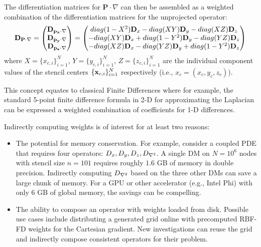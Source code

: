 The differentiation matrices for $\mathbf{P} \cdot \nabla$ can then be assembled as a weighted combination of the differentiation matrices for the unprojected operator: 
\begin{equation}
\mathbf{D}_{\mathbf{P} \cdot \nabla} = \begin{pmatrix} \mathbf{D}_{\mathbf{p_{x} \cdot \nabla}} \\  \mathbf{D}_{\mathbf{p_{y}\cdot \nabla}} \\  \mathbf{D}_{\mathbf{p_{z}\cdot \nabla}} \end{pmatrix} = \begin{pmatrix} 
diag(1-X^{2}) \mathbf{D}_{x} - diag(XY) \mathbf{D}_{y} - diag(XZ) \mathbf{D}_{z} \\
- diag(XY)\mathbf{D}_{x} + diag(1-Y^{2}) \mathbf{D}_{y} - diag(YZ) \mathbf{D}_{z} \\
- diag(XZ)\mathbf{D}_{x} - diag(YZ) \mathbf{D}_{y} + diag(1-Y^{2}) \mathbf{D}_{z} 
\end{pmatrix}
\end{equation}
 where $X = \{x_{c,i}\}_{i=1}^{N}$, $Y = \{y_{c,i}\}_{i=1}^{N}$, $Z = \{z_{c,i}\}_{i=1}^{N}$ are the individual component values of the stencil centers $\{\mathbf{x}_{c,i}\}_{i=1}^{N}$ respectively (i.e., $x_c = (x_c, y_c, z_c)$). 

This concept equates to classical Finite Differences where for example, the standard 5-point finite difference formula in 2-D for approximating the Laplacian can be expressed a weighted combination of coefficients for 1-D differences. 

Indirectly computing weights is of interest for at least two reasons: 
\begin{itemize}
\item The potential for memory conservation. For example, consider a coupled PDE that requires four operators: $D_x, D_y, D_z, D_{\nabla^2}$. A single DM on $N=10^6$ nodes with stencil size $n=101$ requires roughly $1.6$ GB of memory in double precision. Indirectly computing $D_{\nabla^2}$ based on the three other DMs can save a large chunk of memory. For a GPU or other accelerator (e.g., Intel Phi) with only 6 GB of global memory, the savings can be compelling.
\item The ability to compose an operator with weights loaded from disk. Possible use cases include distributing a generated grid online with precomputed RBF-FD weights for the Cartesian gradient. New investigations can reuse the grid and indirectly compose consistent operators for their problem.
\end{itemize}


